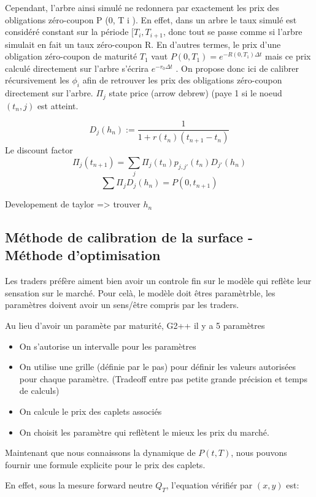 \documentclass[paper=a4, fontsize=11pt]{scrartcl}
\numberwithin{equation}{section}		%
\numberwithin{figure}{section}			%
\numberwithin{table}{section}				%
\theoremstyle{definition}
\begin{document}
Cependant, l’arbre ainsi simulé ne redonnera par exactement les prix des
obligations zéro-coupon P (0, T i ). En effet, dans un arbre le taux simulé est
considéré constant sur la période $[T_i, T_{i+1}$, donc tout se passe comme
si l’arbre simulait en fait un taux zéro-coupon R. En d’autres termes, le prix
d’une obligation zéro-coupon de maturité $T_1$ vaut
$P(0, T_1 ) = e^{-R(0, T_1) \Delta t}$
mais ce prix calculé directement sur l’arbre s’écrira $e^{-r_0\Delta t}$ .
On propose donc ici de calibrer récursivement les $\phi_i$ afin de
retrouver les prix des obligations zéro-coupon directement sur l’arbre. 
$\Pi_j$ state price (arrow debrew) (paye 1 si le noeud $(t_n, j)$ est atteint.

$$D_j(h_n) := \frac{1}{1 + r(t_n)(t_{n+1} - t_n)} $$ Le discount factor
$$ \Pi_j(t_{n+1}) = \sum_j \Pi_j(t_n) p_{j, j'}(t_n) D_{j'}(h_n)$$
$$ \sum \Pi_j D_j(h_n) = P(0, t_{n+1}) $$

Developement de taylor => trouver $h_n$

\subsection{Méthode de calibration de la surface - Méthode d'optimisation}

Les traders préfère aiment bien avoir un controle fin sur le modèle qui reflète leur sensation sur le marché. Pour celà, le modèle doit êtres paramètrble, les paramètres doivent avoir un sens/être compris par les traders.

Au lieu d'avoir un paramète par maturité, G2++ il y a 5 paramètres


\begin{itemize}
\item On s'autorise un intervalle pour les paramètres
\item On utilise une grille (définie par le pas) pour définir les valeurs
  autorisées pour chaque paramètre. (Tradeoff entre pas petite grande
  précision et temps de calculs)
\item On calcule le prix des caplets associés
\item On choisit les paramètre qui reflètent le mieux les prix du
  marché.
\end{itemize}

Maintenant que nous connaissons la dynamique de $P(t, T)$, nous pouvons fournir une formule explicite pour le prix des caplets.

En effet, sous la mesure forward neutre $Q_T$, l'equation vérifiér  par $(x, y)$ est:
\end{document}
